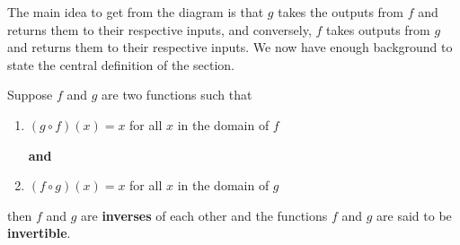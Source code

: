\documentclass{ximera}
\begin{document}
\begin{image}
\end{image}

The main idea to get from the diagram is that $g$ takes the outputs from $f$ and returns them to their respective inputs, and conversely, $f$ takes outputs from $g$ and returns them to their respective inputs.  We now have enough background to state the central definition of the section.


\begin{definition} \label{inversefunctiondefn} Suppose $f$ and $g$ are two functions such that

\begin{enumerate}

\item  $(g \circ f)(x) = x$ for all $x$ in the domain of $f$

 \textbf{and}

\item  $(f \circ g)(x) = x$ for all $x$ in the domain of $g$

\end{enumerate}

then $f$ and $g$ are \textbf{inverses} of each other and the functions $f$ and $g$ are said to be \textbf{invertible}. 

\end{definition}
\end{document}
